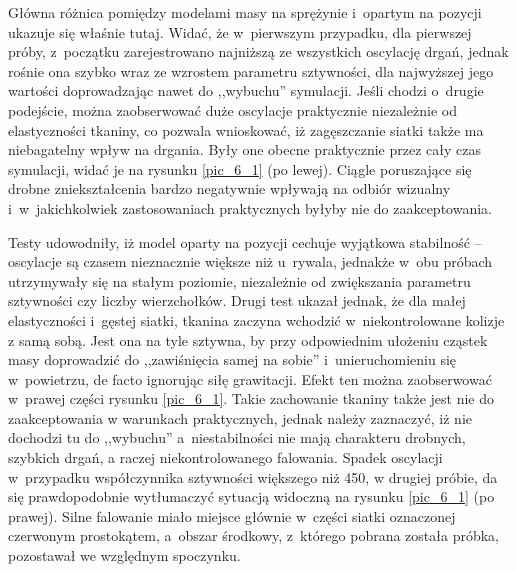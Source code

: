		
		Główna różnica pomiędzy modelami masy na sprężynie i~opartym na pozycji ukazuje się właśnie tutaj. Widać, że w~pierwszym przypadku, dla pierwszej próby, z~początku zarejestrowano najniższą ze wszystkich oscylację drgań, jednak rośnie ona szybko wraz ze wzrostem parametru sztywności, dla najwyższej jego wartości doprowadzając nawet do ,,wybuchu'' symulacji. Jeśli chodzi o~drugie podejście, można zaobserwować duże oscylacje praktycznie niezależnie od elastyczności tkaniny, co pozwala wnioskować, iż zagęszczanie siatki także ma niebagatelny wpływ na drgania. Były one obecne praktycznie przez cały czas symulacji, widać je na rysunku \ref{pic_6_1} (po lewej). Ciągle poruszające się drobne zniekształcenia bardzo negatywnie wpływają na odbiór wizualny i~w~jakichkolwiek zastosowaniach praktycznych byłyby nie do zaakceptowania.
		
		Testy udowodniły, iż model oparty na pozycji cechuje wyjątkowa stabilność -- oscylacje są czasem nieznacznie większe niż u~rywala, jednakże w~obu próbach utrzymywały się na stałym poziomie, niezależnie od zwiększania parametru sztywności czy liczby wierzchołków. Drugi test ukazał jednak, że dla małej elastyczności i~gęstej siatki, tkanina zaczyna wchodzić w~niekontrolowane kolizje z samą sobą. Jest ona na tyle sztywna, by przy odpowiednim ułożeniu cząstek masy doprowadzić do ,,zawiśnięcia samej na sobie'' i~unieruchomieniu się w~powietrzu, de facto ignorując siłę grawitacji. Efekt ten można zaobserwować w~prawej części rysunku \ref{pic_6_1}. Takie zachowanie tkaniny także jest nie do zaakceptowania w warunkach praktycznych, jednak należy zaznaczyć, iż nie dochodzi tu do ,,wybuchu'' a~niestabilności nie mają charakteru drobnych, szybkich drgań, a raczej niekontrolowanego falowania. Spadek oscylacji w~przypadku współczynnika sztywności większego niż 450, w drugiej próbie, da się prawdopodobnie wytłumaczyć sytuacją widoczną na rysunku \ref{pic_6_1} (po prawej). Silne falowanie miało miejsce głównie w~części siatki oznaczonej czerwonym prostokątem, a~obszar środkowy, z~którego pobrana została próbka, pozostawał we względnym spoczynku.
		
		
		
		
